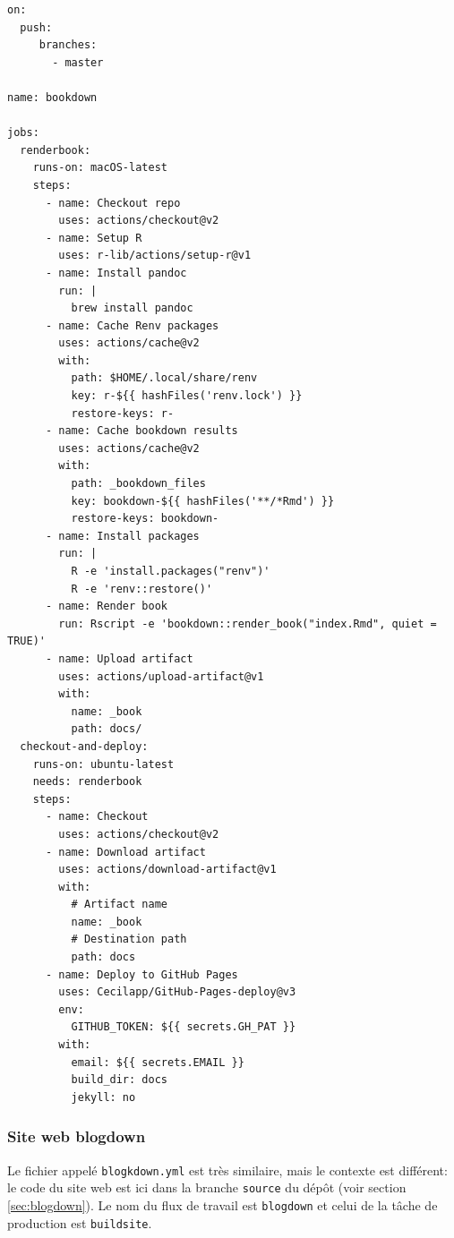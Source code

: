 \documentclass[
  11pt,
  french,
  a4paper,
  extrafontsizes,onecolumn,openright
  ]{memoir}
\begin{document}
\begin{verbatim}
on:
  push:
     branches:
       - master

name: bookdown

jobs:
  renderbook:
    runs-on: macOS-latest
    steps:
      - name: Checkout repo
        uses: actions/checkout@v2
      - name: Setup R
        uses: r-lib/actions/setup-r@v1
      - name: Install pandoc
        run: |
          brew install pandoc
      - name: Cache Renv packages
        uses: actions/cache@v2
        with:
          path: $HOME/.local/share/renv
          key: r-${{ hashFiles('renv.lock') }}
          restore-keys: r-
      - name: Cache bookdown results
        uses: actions/cache@v2
        with:
          path: _bookdown_files
          key: bookdown-${{ hashFiles('**/*Rmd') }}
          restore-keys: bookdown-
      - name: Install packages
        run: |
          R -e 'install.packages("renv")'
          R -e 'renv::restore()'
      - name: Render book
        run: Rscript -e 'bookdown::render_book("index.Rmd", quiet = TRUE)'
      - name: Upload artifact
        uses: actions/upload-artifact@v1
        with:
          name: _book
          path: docs/
  checkout-and-deploy:
    runs-on: ubuntu-latest
    needs: renderbook
    steps:
      - name: Checkout
        uses: actions/checkout@v2
      - name: Download artifact
        uses: actions/download-artifact@v1
        with:
          # Artifact name
          name: _book
          # Destination path
          path: docs
      - name: Deploy to GitHub Pages
        uses: Cecilapp/GitHub-Pages-deploy@v3
        env:
          GITHUB_TOKEN: ${{ secrets.GH_PAT }}
        with:
          email: ${{ secrets.EMAIL }}
          build_dir: docs
          jekyll: no
\end{verbatim}

\hypertarget{sec:blogdown-ci}{%
\subsubsection{Site web blogdown}\label{sec:blogdown-ci}}

Le fichier appelé \texttt{blogkdown.yml} est très similaire, mais le contexte est différent: le code du site web est ici dans la branche \texttt{source} du dépôt (voir section \ref{sec:blogdown}).
Le nom du flux de travail est \texttt{blogdown} et celui de la tâche de production est \texttt{buildsite}.
\end{document}
